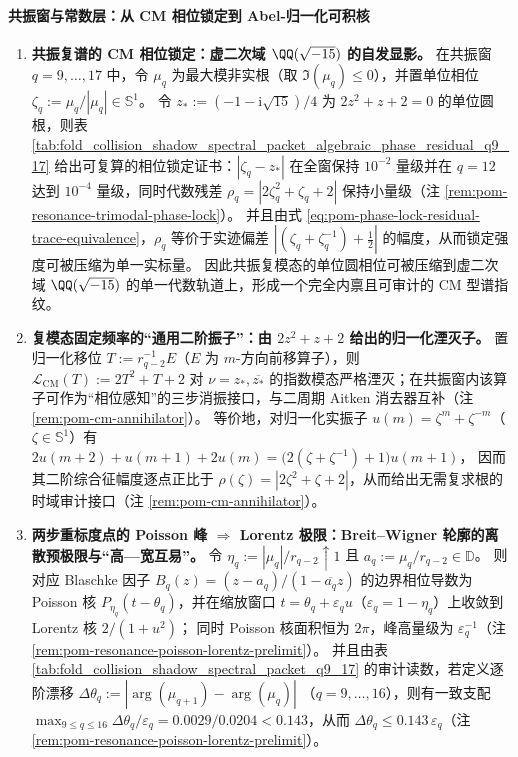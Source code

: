 \paragraph{共振窗与常数层：从 CM 相位锁定到 Abel-归一化可积核}
\begin{enumerate}
  \item \textbf{共振复谱的 CM 相位锁定：虚二次域 \texorpdfstring{$\QQ(\sqrt{-15})$}{Q(sqrt(-15))} 的自发显影。}
  在共振窗 \(q=9,\dots,17\) 中，令 \(\mu_q\) 为最大模非实根（取 \(\Im(\mu_q)\le 0\)），并置单位相位
  \(\zeta_q:=\mu_q/|\mu_q|\in\mathbb{S}^1\)。
  令
  \(
  z_\ast:=(-1-\mathrm{i}\sqrt{15})/4
  \)
  为 \(2z^2+z+2=0\) 的单位圆根，则表 \ref{tab:fold_collision_shadow_spectral_packet_algebraic_phase_residual_q9_17} 给出可复算的相位锁定证书：\(|\zeta_q-z_\ast|\) 在全窗保持 \(10^{-2}\) 量级并在 \(q=12\) 达到 \(10^{-4}\) 量级，同时代数残差 \(\rho_q=|2\zeta_q^2+\zeta_q+2|\) 保持小量级（注 \ref{rem:pom-resonance-trimodal-phase-lock}）。
  并且由式 \eqref{eq:pom-phase-lock-residual-trace-equivalence}，\(\rho_q\) 等价于实迹偏差 \(|(\zeta_q+\zeta_q^{-1})+\tfrac12|\) 的幅度，从而锁定强度可被压缩为单一实标量。
  因此共振复模态的单位圆相位可被压缩到虚二次域 \(\QQ(\sqrt{-15})\) 的单一代数轨道上，形成一个完全内禀且可审计的 CM 型谱指纹。

  \item \textbf{复模态固定频率的“通用二阶振子”：由 \texorpdfstring{$2z^2+z+2$}{2z^2+z+2} 给出的归一化湮灭子。}
  置归一化移位 \(T:=r_{q-2}^{-1}E\)（\(E\) 为 \(m\)-方向前移算子），则 \(\mathcal L_{\mathrm{CM}}(T):=2T^2+T+2\) 对 \(\nu=z_\ast,\overline{z_\ast}\) 的指数模态严格湮灭；在共振窗内该算子可作为“相位感知”的三步消振接口，与二周期 Aitken 消去器互补（注 \ref{rem:pom-cm-annihilator}）。
  等价地，对归一化实振子 \(u(m)=\zeta^{m}+\zeta^{-m}\)（\(\zeta\in\mathbb{S}^1\)）有
  \(2u(m+2)+u(m+1)+2u(m)=\bigl(2(\zeta+\zeta^{-1})+1\bigr)u(m+1)\)，
  因而其二阶综合征幅度逐点正比于 \(\rho(\zeta)=|2\zeta^2+\zeta+2|\)，从而给出无需复求根的时域审计接口（注 \ref{rem:pom-cm-annihilator}）。

  \item \textbf{两步重标度点的 Poisson 峰 \texorpdfstring{$\Rightarrow$}{=>} Lorentz 极限：Breit--Wigner 轮廓的离散预极限与“高—宽互易”。}
  令 \(\eta_q:=|\mu_q|/r_{q-2}\uparrow 1\) 且 \(a_q:=\mu_q/r_{q-2}\in\mathbb{D}\)。
  则对应 Blaschke 因子 \(B_q(z)=(z-a_q)/(1-\overline{a_q}z)\) 的边界相位导数为 Poisson 核 \(P_{\eta_q}(t-\theta_q)\)，并在缩放窗口 \(t=\theta_q+\varepsilon_q u\)（\(\varepsilon_q=1-\eta_q\)）上收敛到 Lorentz 核 \(2/(1+u^2)\)；
  同时 Poisson 核面积恒为 \(2\pi\)，峰高量级为 \(\varepsilon_q^{-1}\)（注 \ref{rem:pom-resonance-poisson-lorentz-prelimit}）。
  并且由表 \ref{tab:fold_collision_shadow_spectral_packet_q9_17} 的审计读数，若定义逐阶漂移
  \(
  \Delta\theta_q:=|\arg(\mu_{q+1})-\arg(\mu_q)|
  \)
  （\(q=9,\dots,16\)），则有一致支配
  \(
  \max_{9\le q\le 16}\Delta\theta_q/\varepsilon_q
  =0.0029/0.0204<0.143
  \)，从而 \(\Delta\theta_q\le 0.143\,\varepsilon_q\)（注 \ref{rem:pom-resonance-poisson-lorentz-prelimit}）。


\end{enumerate}
